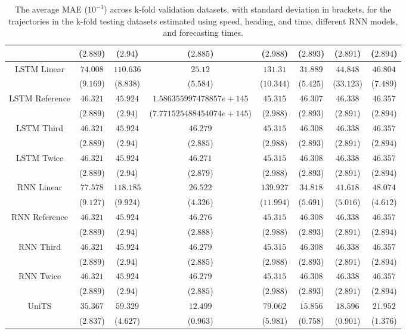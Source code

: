 \begin{table}[!ht]
{\begin{tabular}{|c|c|c|c|c|c|c|c|}
			 & ($2.889$) & ($2.94$) & ($2.885$) & ($2.988$) & ($2.893$) & ($2.891$) & ($2.894$) \\ \hline
			\multirow{2}{*}{LSTM Linear} & $74.008$ & $110.636$ & $25.12$ & $131.31$ & $31.889$ & $44.848$ & $46.804$ \\
			 & ($9.169$) & ($8.838$) & ($5.584$) & ($10.344$) & ($5.425$) & ($33.123$) & ($7.489$) \\ \hline
			\multirow{2}{*}{LSTM Reference} & $46.321$ & $45.924$ & $1.586355997478857e+145$ & $45.315$ & $46.307$ & $46.338$ & $46.357$ \\
			 & ($2.889$) & ($2.94$) & ($7.771525488454074e+145$) & ($2.988$) & ($2.893$) & ($2.891$) & ($2.894$) \\ \hline
			\multirow{2}{*}{LSTM Third} & $46.321$ & $45.924$ & $46.279$ & $45.315$ & $46.308$ & $46.338$ & $46.357$ \\
			 & ($2.889$) & ($2.94$) & ($2.885$) & ($2.988$) & ($2.893$) & ($2.891$) & ($2.894$) \\ \hline
			\multirow{2}{*}{LSTM Twice} & $46.321$ & $45.924$ & $46.271$ & $45.315$ & $46.308$ & $46.338$ & $46.357$ \\
			 & ($2.889$) & ($2.94$) & ($2.879$) & ($2.988$) & ($2.893$) & ($2.891$) & ($2.894$) \\ \hline
			\multirow{2}{*}{RNN Linear} & $77.578$ & $118.185$ & $26.522$ & $139.927$ & $34.818$ & $41.618$ & $48.074$ \\
			 & ($9.127$) & ($9.924$) & ($4.326$) & ($11.994$) & ($5.691$) & ($5.016$) & ($4.612$) \\ \hline
			\multirow{2}{*}{RNN Reference} & $46.321$ & $45.924$ & $46.276$ & $45.315$ & $46.308$ & $46.338$ & $46.357$ \\
			 & ($2.889$) & ($2.94$) & ($2.888$) & ($2.988$) & ($2.893$) & ($2.891$) & ($2.894$) \\ \hline
			\multirow{2}{*}{RNN Third} & $46.321$ & $45.924$ & $46.279$ & $45.315$ & $46.308$ & $46.338$ & $46.357$ \\
			 & ($2.889$) & ($2.94$) & ($2.885$) & ($2.988$) & ($2.893$) & ($2.891$) & ($2.894$) \\ \hline
			\multirow{2}{*}{RNN Twice} & $46.321$ & $45.924$ & $46.279$ & $45.315$ & $46.308$ & $46.338$ & $46.357$ \\
			 & ($2.889$) & ($2.94$) & ($2.885$) & ($2.988$) & ($2.893$) & ($2.891$) & ($2.894$) \\ \hline
			\multirow{2}{*}{UniTS} & $35.367$ & $59.329$ & $12.499$ & $79.062$ & $15.856$ & $18.596$ & $21.952$ \\
			 & ($2.837$) & ($4.627$) & ($0.963$) & ($5.981$) & ($0.758$) & ($0.901$) & ($1.376$) \\ \hline
		\end{tabular}
	}
	\caption{The average MAE ($10^{-3}$) across k-fold validation datasets, with standard deviation in brackets, for the trajectories in the k-fold testing datasets estimated using speed, heading, and time, different RNN models, and forecasting times.}
	\label{tab:all_speed_actual_dir_MAE}
\end{table}